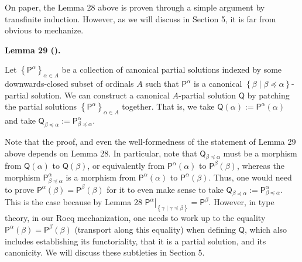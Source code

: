  
 
 
On paper, the Lemma 28 above is proven through a simple argument by transfinite induction. However, as we will discuss in Section 5, it is far from obvious to mechanize.\par
 
 
 
\par\medskip\noindent\textbf{Lemma 29 ().}\par
 
 
Let $\left\{\boldsymbol{\mathsf{P}}^{\alpha}\right\}_{\alpha\in A}$ be a collection of canonical partial solutions indexed by some downwards-closed subset of ordinals $A$ such that $\boldsymbol{\mathsf{P}}^{\alpha}$ is a canonical $\left\{\beta\middle|\beta\preceq\alpha\right\}$-partial solution. We can construct a canonical $A$-partial solution $\boldsymbol{\mathsf{Q}}$ by patching the partial solutions $\left\{\boldsymbol{\mathsf{P}}^{\alpha}\right\}_{\alpha\in A}$ together. That is, we take $\boldsymbol{\mathsf{Q}}(\alpha):=\boldsymbol{\mathsf{P}}^{\alpha}(\alpha)$ and take $\boldsymbol{\mathsf{Q}}_{\beta\preceq\alpha}:=\boldsymbol{\mathsf{P}}^{\alpha}_{\beta\preceq\alpha}$.\par
 
 
 
 
Note that the proof, and even the well-formedness of the statement of Lemma 29 above depends on Lemma 28. In particular, note that $\boldsymbol{\mathsf{Q}}_{\beta\preceq\alpha}$ must be a morphism from $\boldsymbol{\mathsf{Q}}(\alpha)$ to $\boldsymbol{\mathsf{Q}}(\beta)$, or equivalently from $\boldsymbol{\mathsf{P}}^{\alpha}(\alpha)$ to $\boldsymbol{\mathsf{P}}^{\beta}(\beta)$, whereas the morphism $\boldsymbol{\mathsf{P}}^{\alpha}_{\beta\preceq\alpha}$ is a morphism from $\boldsymbol{\mathsf{P}}^{\alpha}(\alpha)$ to $\boldsymbol{\mathsf{P}}^{\alpha}(\beta)$. Thus, one would need to prove $\boldsymbol{\mathsf{P}}^{\alpha}(\beta)=\boldsymbol{\mathsf{P}}^{\beta}(\beta)$ for it to even make sense to take $\boldsymbol{\mathsf{Q}}_{\beta\preceq\alpha}:=\boldsymbol{\mathsf{P}}^{\alpha}_{\beta\preceq\alpha}$. This is the case because by Lemma 28 ${\left.\boldsymbol{\mathsf{P}}^{\alpha}\right|}_{\left\{\gamma\middle|\gamma\preceq\beta\right\}}=\boldsymbol{\mathsf{P}}^{\beta}$. However, in type theory, in our Rocq mechanization, one needs to work up to the equality $\boldsymbol{\mathsf{P}}^{\alpha}(\beta)=\boldsymbol{\mathsf{P}}^{\beta}(\beta)$ (transport along this equality) when defining $\boldsymbol{\mathsf{Q}}$, which also includes establishing its functoriality, that it is a partial solution, and its canonicity. We will discuss these subtleties in Section 5.\par
 
